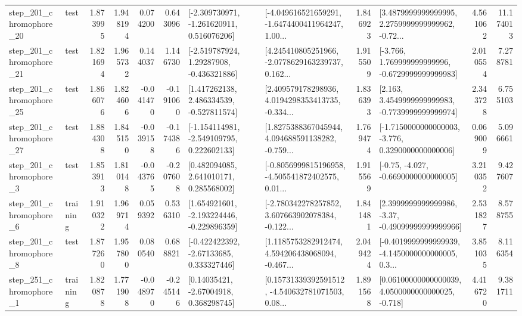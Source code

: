 \begin{tabular}{llrrrrllrlrr}
  step\_201\_chromophore\_20 &      test &      1.873995 &    1.948194 &      0.074200 &  0.643096 &   [-2.309730971, -1.261620911, 0.516076206] &  [-4.049616521659291, -1.6474400411964247, 1.00... &       1.846923 &  [3.4879999999999995, 2.2759999999999962, -0.72... &            4.561062 &         11.174013 \\
  step\_201\_chromophore\_21 &      test &      1.821694 &    1.965732 &      0.144037 &  1.146730 &    [-2.519787924, 1.29287908, -0.436321886] &  [4.245410805251966, -2.0778629163239737, 0.162... &       1.915509 &   [-3.766, 1.769999999999996, -0.6729999999999983] &            2.010554 &          7.278781 \\
  step\_201\_chromophore\_25 &      test &      1.866076 &    1.824606 &     -0.041470 & -0.191060 &    [1.417262138, 2.486334539, -0.527811574] &  [2.409579178298936, 4.0194298353413735, -0.334... &       1.836393 &   [2.163, 3.4549999999999983, -0.7739999999999974] &            2.343728 &          6.755103 \\
  step\_201\_chromophore\_27 &      test &      1.884308 &    1.845150 &     -0.039158 & -0.174386 &   [-1.154114981, -2.549109795, 0.222602133] &  [1.8275388367045944, 4.094688591138282, -0.759... &       1.769474 &  [-1.7150000000000003, -3.776, 0.3290000000000006] &            0.069009 &          5.096661 \\
   step\_201\_chromophore\_3 &      test &      1.853913 &    1.810148 &     -0.043765 & -0.207608 &     [0.482094085, 2.641010171, 0.285568002] &  [-0.8056999815196958, -4.505541872402575, 0.01... &       1.915569 &               [-0.75, -4.027, -0.6690000000000005] &            3.210352 &          9.427607 \\
   step\_201\_chromophore\_6 &  training &      1.910322 &    1.969714 &      0.059392 &  0.536310 &   [1.654921601, -2.193224446, -0.229896359] &  [-2.780342278257852, 3.607663902078384, -0.122... &       1.841481 &  [2.3999999999999986, -3.37, -0.49099999999999966] &            2.531827 &          8.578755 \\
   step\_201\_chromophore\_8 &      test &      1.877260 &    1.957800 &      0.080540 &  0.688821 &    [-0.422422392, -2.67133685, 0.333327446] &  [1.1185753282912474, 4.594206438068094, -0.467... &       2.049424 &  [-0.4019999999999939, -4.1450000000000005, 0.3... &            3.851035 &          8.116354 \\
   step\_251\_chromophore\_1 &  training &      1.820878 &    1.771908 &     -0.048970 & -0.245146 &      [0.14035421, -2.67004918, 0.368298745] &  [0.15731339392591512, -4.540632781071503, 0.08... &       1.891568 &  [0.06100000000000039, 4.0500000000000025, -0.718] &            4.416720 &          9.381711 \\

\end{tabular}
